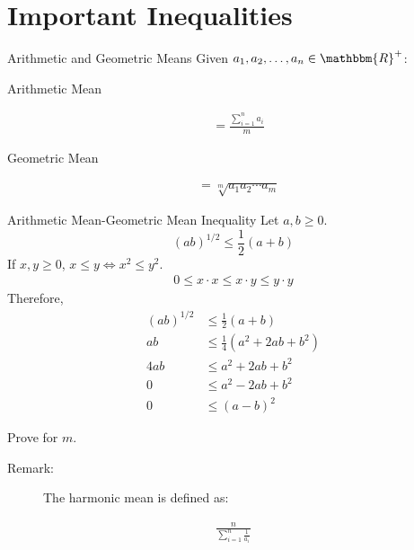 \documentclass[10pt]{extarticle}
\newcommand{\R}{\mathbbm{R}}
\begin{document}
  \section*{Important Inequalities}%
  \begin{problem}{Arithmetic and Geometric Means}
    Given $a_1,a_2,\dots,a_n\in \R^+$:
    \begin{description}
      \item[Arithmetic Mean]
    \end{description}
    \begin{align*}
      &= \frac{\sum_{i =1}^{n} a_i}{m}
    \end{align*}
    \begin{description}
      \item[Geometric Mean]
    \end{description}
    \begin{align*}
      &= \sqrt[m]{a_1a_2\cdots a_m}
    \end{align*}
    \begin{problem}{Arithmetic Mean-Geometric Mean Inequality}
      Let $a,b \geq 0$.
      \[
        (ab)^{1/2} \leq \frac{1}{2}(a+b)
      \] 
      \tcblower
      If $x,y \geq 0$, $x\leq y \Leftrightarrow x^2 \leq y^2$.
      \begin{align*}
          0 \leq x\cdot x \leq x \cdot y \leq y\cdot y\tag*{by property (ii) of ordered fields}
      \end{align*}
      Therefore,  
      \begin{align*}
        (ab)^{1/2}&\leq \frac{1}{2}(a+b)\\
        ab &\leq \frac{1}{4}(a^2 + 2ab + b^2)\\
        4ab &\leq a^2 + 2ab + b^2 \\
        0 &\leq a^2 - 2ab + b^2\\
        0 &\leq (a-b)^2 \tag*{by definition}
      \end{align*}
      \begin{description}
        \small
        \item[Challenge:] Prove for $m$.
      \end{description}
    \end{problem}
    \begin{description}
      \item[Remark:] The harmonic mean is defined as:
    \end{description}
    \begin{align*}
      \frac{n}{\displaystyle\sum_{i=1}^{n}\frac{1}{a_i}}
    \end{align*}
  \end{problem}
\end{document}
